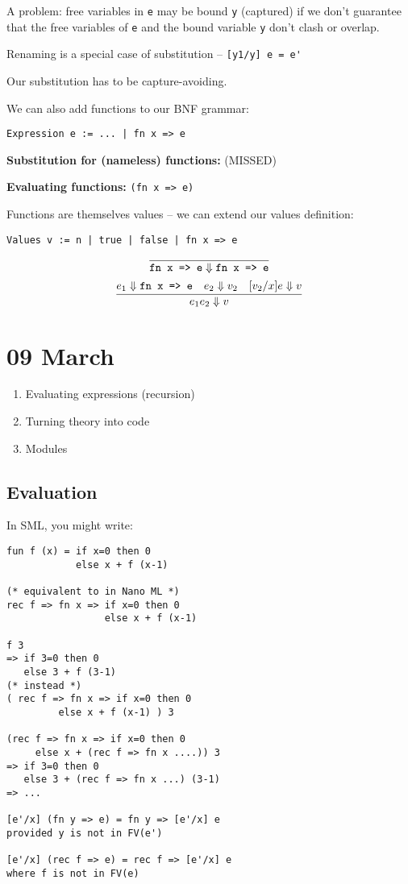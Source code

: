 \documentclass[11pt]{article}
\begin{document}
A problem: free variables in \verb~e~ may be bound \verb~y~ (captured) if we don't guarantee that the free variables of \verb~e~ and the bound variable \verb~y~ don't clash or overlap. 

Renaming is a special case of substitution -- \verb~[y1/y] e = e'~

Our substitution has to be capture-avoiding.

We can also add functions to our BNF grammar:
\begin{verbatim}
Expression e := ... | fn x => e
\end{verbatim}

\textbf{Substitution for (nameless) functions:} (MISSED)

\textbf{Evaluating functions:} \verb~(fn x => e)~

Functions are themselves values -- we can extend our values definition:
\begin{verbatim}
Values v := n | true | false | fn x => e
\end{verbatim}

\[
    \infer{\verb~fn x => e~ \Downarrow \verb~fn x => e~}{}
\]
\[
    \infer{e_1 e_2 \Downarrow v}{
        e_1 \Downarrow \verb~fn x => e~
        &
        e_2 \Downarrow v_2
        &
        [v_2/x] e \Downarrow v
    }
\]

\section{09 March}
\begin{enumerate}
    \item Evaluating expressions (recursion)
    \item Turning theory into code
    \item Modules
\end{enumerate}

\subsection{Evaluation}
    
In SML, you might write:
\begin{verbatim}
fun f (x) = if x=0 then 0
            else x + f (x-1)

(* equivalent to in Nano ML *)
rec f => fn x => if x=0 then 0
                 else x + f (x-1)

f 3
=> if 3=0 then 0
   else 3 + f (3-1)
(* instead *)
( rec f => fn x => if x=0 then 0
         else x + f (x-1) ) 3

(rec f => fn x => if x=0 then 0
     else x + (rec f => fn x ....)) 3
=> if 3=0 then 0
   else 3 + (rec f => fn x ...) (3-1)
=> ...

[e'/x] (fn y => e) = fn y => [e'/x] e
provided y is not in FV(e')

[e'/x] (rec f => e) = rec f => [e'/x] e
where f is not in FV(e)
\end{verbatim}
\end{document}
